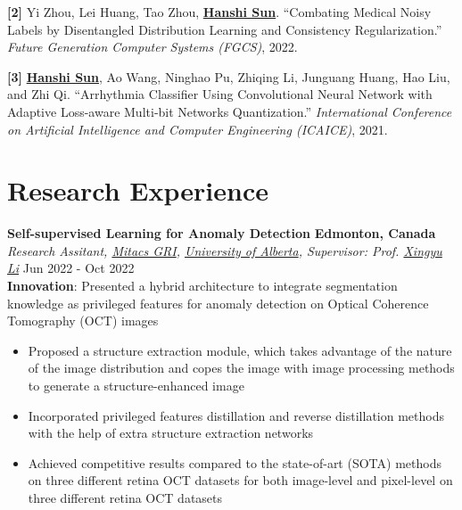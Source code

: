 \documentclass[letterpaper,11pt]{article}
\begin{document}
\textbf{[2]} Yi Zhou, Lei Huang, Tao Zhou, \underline{\textbf{Hanshi Sun}}. ``Combating Medical Noisy Labels by Disentangled Distribution Learning and Consistency Regularization.'' \textit{Future Generation Computer Systems (FGCS)}, 2022.\\
\vspace{3pt}

\textbf{[3]} \underline{\textbf{Hanshi Sun}}, Ao Wang, Ninghao Pu, Zhiqing Li, Junguang Huang, Hao Liu, and Zhi Qi. ``Arrhythmia Classifier Using Convolutional Neural Network with Adaptive Loss-aware Multi-bit Networks Quantization.'' \textit{International Conference on Artificial Intelligence and Computer Engineering (ICAICE)}, 2021.\\
\vspace{3pt}
\vspace{-9pt}

\section{\textbf{Research Experience}}
{\bf Self-supervised Learning for Anomaly Detection} \hfill{\textbf{Edmonton, Canada}}\\

\textit{Research Assitant, \href{https://www.mitacs.ca/en/programs/globalink/globalink-research-internship}{Mitacs GRI}, \href{https://www.ualberta.ca/index.html}{University of Alberta}, Supervisor: Prof. {\href{https://www.ece.ualberta.ca/~xingyu/index.html}{Xingyu Li}}} \hfill{Jun 2022 - Oct 2022}\\

\textbf{Innovation}: Presented a hybrid architecture to integrate segmentation knowledge as privileged features for anomaly detection on Optical Coherence Tomography (OCT) images
\begin{itemize}
    \item Proposed a structure extraction module, which takes advantage of the nature of the image distribution and  copes the image with image processing methods to generate a structure-enhanced image
    \item Incorporated privileged features distillation and reverse distillation methods with the help of extra structure extraction networks
    \item Achieved competitive results compared to the state-of-art (SOTA) methods on three different retina OCT datasets  for both image-level and pixel-level on three different retina OCT datasets
\end{itemize}
\vspace{2pt}
\end{document}
